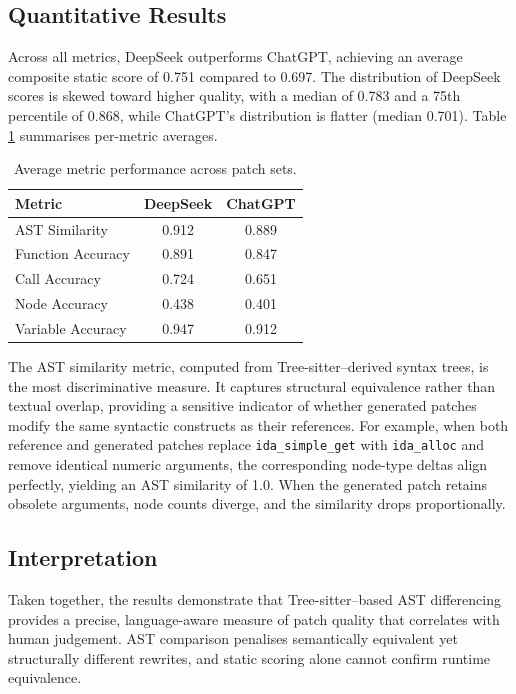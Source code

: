 
\subsection{Quantitative Results}

Across all metrics, DeepSeek outperforms ChatGPT, achieving an average composite static score of 0.751 compared to 0.697. The distribution of DeepSeek scores is skewed toward higher quality, with a median of 0.783 and a 75th percentile of 0.868, while ChatGPT's distribution is flatter (median 0.701). Table \ref{tab:metric-breakdown} summarises per-metric averages.

\begin{table}[h]
\centering
\caption{Average metric performance across patch sets.}
\label{tab:metric-breakdown}
\begin{tabular}{lcc}
\toprule
\textbf{Metric} & \textbf{DeepSeek} & \textbf{ChatGPT} \\
\midrule
AST Similarity    & 0.912 & 0.889 \\
Function Accuracy & 0.891 & 0.847 \\
Call Accuracy     & 0.724 & 0.651 \\
Node Accuracy     & 0.438 & 0.401 \\
Variable Accuracy & 0.947 & 0.912 \\
\bottomrule
\end{tabular}
\end{table}

The AST similarity metric, computed from Tree-sitter--derived syntax trees, is the most discriminative measure. It captures structural equivalence rather than textual overlap, providing a sensitive indicator of whether generated patches modify the same syntactic constructs as their references. For example, when both reference and generated patches replace \texttt{ida\_simple\_get} with \texttt{ida\_alloc} and remove identical numeric arguments, the corresponding node-type deltas align perfectly, yielding an AST similarity of 1.0. When the generated patch retains obsolete arguments, node counts diverge, and the similarity drops proportionally.

\subsection{Interpretation}

Taken together, the results demonstrate that Tree-sitter--based AST differencing provides a precise, language-aware measure of patch quality that correlates with human judgement. AST comparison penalises semantically equivalent yet structurally different rewrites, and static scoring alone cannot confirm runtime equivalence.
